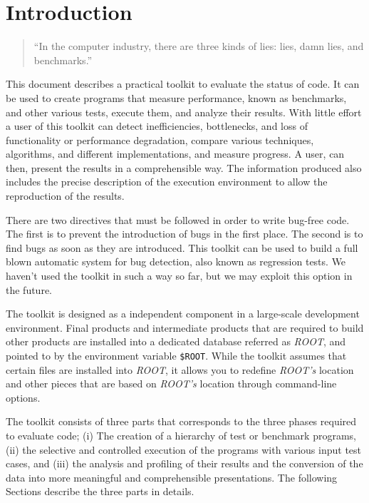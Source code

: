 
\section{Introduction}
\begin{verse}
``In the computer industry, there are three kinds of lies: lies, damn
 lies, and benchmarks.''
\end{verse}
This document describes a practical toolkit to evaluate the status of
code. It can be used to create programs that measure performance,
known as benchmarks, and other various tests, execute them, and
analyze their results. With little effort a user of this toolkit can
detect inefficiencies, bottlenecks, and loss of functionality or
performance degradation, compare various techniques, algorithms, and
different implementations, and measure progress. A user, can then,
present the results in a comprehensible way. The information produced
also includes the precise description of the execution environment to
allow the reproduction of the results.

There are two directives that must be followed in order to write
bug-free code. The first is to prevent the introduction of bugs in the
first place. The second is to find bugs as soon as they are
introduced. This toolkit can be used to build a full blown automatic
system for bug detection, also known as regression tests. We haven't
used the toolkit in such a way so far, but we may exploit this option
in the future.

The toolkit is designed as a independent component in a large-scale
development environment. Final products and intermediate products that
are required to build other products are installed into a dedicated
database referred as {\em ROOT}, and pointed to by the environment
variable {\tt \$ROOT}. While the toolkit assumes that certain files are
installed into {\em ROOT}, it allows you to redefine {\em ROOT's}
location and other pieces that are based on {\em ROOT's} location
through command-line options.

The toolkit consists of three parts that corresponds to the three phases
required to evaluate code; (i) The creation of a hierarchy of test or benchmark
programs, (ii) the selective and controlled execution of the programs with
various input test cases, and (iii) the analysis and profiling of their results
and the conversion of the data into more meaningful and comprehensible
presentations. The following Sections describe the three parts in details.

